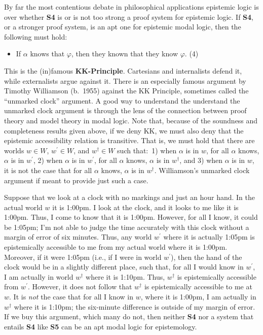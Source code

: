 \documentclass[11pt]{article}
\theoremstyle{definition}
\theoremstyle{remark}
\begin{document}
By far the most contentious debate in philosophical applications epistemic logic is over whether \textbf{S4} is or is not too strong a proof system for epistemic logic. If \textbf{S4}, or a stronger proof system, is an apt one for epistemic modal logic, then the following must hold:
\begin{itemize}
    \item If $\alpha$ knows that $\varphi$, then they known that they know $\varphi$. (4)
\end{itemize}
This is the (in)famous \textbf{KK-Principle}. Cartesians and internalists defend it, while externalists argue against it. There is an especially famous argument by Timothy Williamson (b.\ 1955) against the KK Principle, sometimes called the ``unmarked clock'' argument. A good way to understand the understand the unmarked clock argument is through the lens of the connection between proof theory and model theory in modal logic. Note that, because of the soundness and completeness results given above, if we deny KK, we must also deny that the epistemic accessibility relation is transitive. That is, we must hold that there are worlds $w\in W$, $w^{\prime}\in W$, and $w^{\dagger}\in W$ such that:\ 1) when $\alpha$ is in $w$, for all $\alpha$ knows, $\alpha$ is in $w^{\prime}$, 2) when $\alpha$ is in $w^{\prime}$, for all $\alpha$ knows, $\alpha$ is in $w^{\dagger}$, and 3) when $\alpha$ is in $w$, it is not the case that for all $\alpha$ knows, $\alpha$ is in $w^{\dagger}$. Williamson's unmarked clock argument if meant to provide just such a case.\par


Suppose that we look at a clock with no markings and just an hour hand. In the actual world $w$ it is 1:00pm. I look at the clock, and it looks to me like it is 1:00pm. Thus, I come to know that it is 1:00pm. However, for all I know, it could be 1:05pm; I'm not able to judge the time accurately with this clock without a margin of error of six minutes. Thus, any world $w^{\prime}$ where it is actually 1:05pm is epistemically accessible to me from my actual world where it is 1:00pm. Moreover, if it were 1:05pm (i.e., if I were in world $w^{\prime}$), then the hand of the clock would be in a slightly different place, such that, for all I would know in $w^{\prime}$, I am actually in world $w^{\dagger}$ where it is 1:10pm. Thus, $w^{\dagger}$ is epistemically accessible from $w^{\prime}$. However, it does not follow that $w^{\dagger}$ is epistemically accessible to me at $w$. It is \textit{not} the case that for all I know in $w$, where it is 1:00pm, I am actually in $w^{\dagger}$ where it is 1:10pm; the six-minute difference is outside of my margin of error. If we buy this argument, which many do not, then neither \textbf{S4} nor a system that entails \textbf{S4} like \textbf{S5} can be an apt modal logic for epistemology.\par 
\end{document}
